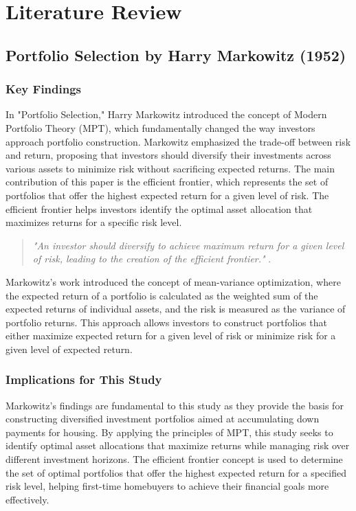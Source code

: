 \section{Literature Review}

\subsection{Portfolio Selection by Harry Markowitz (1952)}

\subsubsection{Key Findings}
In "Portfolio Selection," Harry Markowitz introduced the concept of Modern Portfolio Theory (MPT), which fundamentally changed the way investors approach portfolio construction. Markowitz emphasized the trade-off between risk and return, proposing that investors should diversify their investments across various assets to minimize risk without sacrificing expected returns. The main contribution of this paper is the efficient frontier, which represents the set of portfolios that offer the highest expected return for a given level of risk. The efficient frontier helps investors identify the optimal asset allocation that maximizes returns for a specific risk level.

\begin{quote}
\textit{"An investor should diversify to achieve maximum return for a given level of risk, leading to the creation of the efficient frontier."} \citep{markowitz1952portfolio}.
\end{quote}

Markowitz's work introduced the concept of mean-variance optimization, where the expected return of a portfolio is calculated as the weighted sum of the expected returns of individual assets, and the risk is measured as the variance of portfolio returns. This approach allows investors to construct portfolios that either maximize expected return for a given level of risk or minimize risk for a given level of expected return.

\subsubsection{Implications for This Study}
Markowitz's findings are fundamental to this study as they provide the basis for constructing diversified investment portfolios aimed at accumulating down payments for housing. By applying the principles of MPT, this study seeks to identify optimal asset allocations that maximize returns while managing risk over different investment horizons. The efficient frontier concept is used to determine the set of optimal portfolios that offer the highest expected return for a specified risk level, helping first-time homebuyers to achieve their financial goals more effectively.

